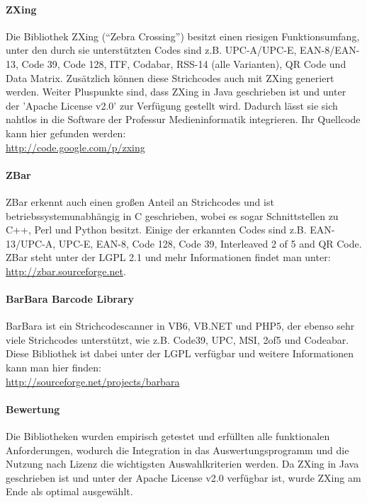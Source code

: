 \paragraph*{ZXing}
\label{par:zxing}
Die Bibliothek ZXing ("`Zebra Crossing"') besitzt einen riesigen Funktionsumfang, unter den durch sie unterstützten Codes sind z.B. UPC-A/UPC-E, EAN-8/EAN-13, Code 39, Code 128, ITF, Codabar, RSS-14 (alle Varianten), QR Code und Data Matrix. Zusätzlich können diese Strichcodes auch mit ZXing generiert werden. Weiter Pluspunkte sind, dass ZXing in Java geschrieben ist und unter der 'Apache License v2.0' zur Verfügung gestellt wird. Dadurch lässt sie sich nahtlos in die Software der Professur Medieninformatik integrieren. Ihr Quell\-code kann hier gefunden werden:\\
\url{http://code.google.com/p/zxing}

\paragraph*{ZBar}
ZBar erkennt auch einen großen Anteil an Strichcodes und ist betriebssystem\-unabhängig in C geschrieben, wobei es sogar Schnittstellen zu C++, Perl und Python besitzt. Einige der erkannten Codes sind z.B. EAN-13/UPC-A, UPC-E, EAN-8, Code 128, Code 39, Interleaved 2 of 5 and QR Code. ZBar steht unter der LGPL 2.1 und mehr Informationen findet man unter:\\
\url{http://zbar.sourceforge.net}.

\paragraph*{BarBara Barcode Library}
BarBara ist ein Strichcodescanner in VB6, VB.NET und PHP5, der ebenso sehr viele Strichcodes unterstützt, wie z.B. Code39, UPC, MSI, 2of5 und Codeabar. Diese Bibliothek ist dabei unter der LGPL verfügbar und weitere Informationen kann man hier finden:\\
\url{http://sourceforge.net/projects/barbara}

\paragraph*{Bewertung}
Die Bibliotheken wurden empirisch getestet und erfüllten alle funktionalen Anforderungen, wodurch die Integration in das Auswertungsprogramm und die Nutzung nach Lizenz die wichtigsten Auswahlkriterien werden. Da ZXing in Java geschrieben ist und unter der Apache License v2.0 verfügbar ist, wurde ZXing am Ende als optimal ausgewählt.

